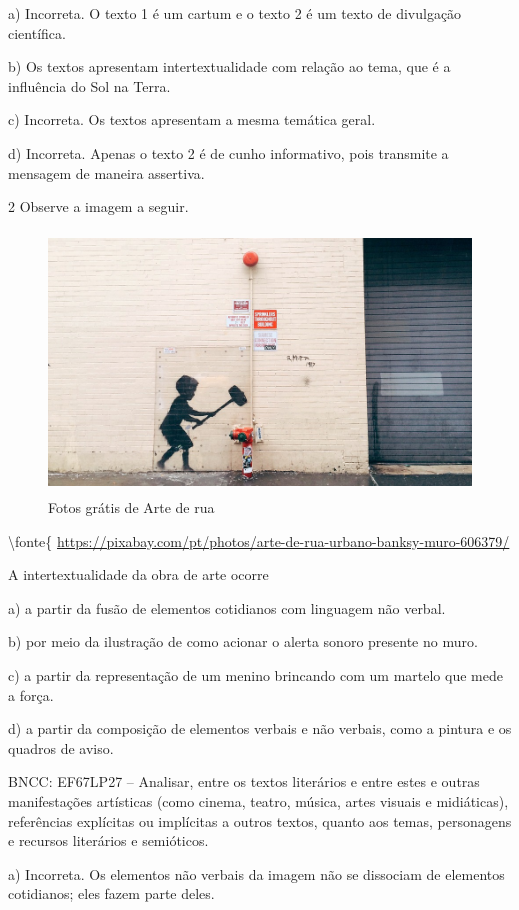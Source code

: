 a) Incorreta. O texto 1 é um cartum e o texto 2 é um texto de divulgação
científica.

b) Os textos apresentam intertextualidade com relação ao tema, que é a
influência do Sol na Terra.

c) Incorreta. Os textos apresentam a mesma temática geral.

d) Incorreta. Apenas o texto 2 é de cunho informativo, pois transmite a
mensagem de maneira assertiva.

\num{2} Observe a imagem a seguir.

\begin{figure}
\centering
\includegraphics[width=4.69016in,height=2.73611in]{./imgSAEB_6_POR/media/image13.jpeg}
\caption{Fotos grátis de Arte de rua}
\end{figure}

\textbackslash fonte\{
\url{https://pixabay.com/pt/photos/arte-de-rua-urbano-banksy-muro-606379/}

A intertextualidade da obra de arte ocorre

a) a partir da fusão de elementos cotidianos com linguagem não verbal.

b) por meio da ilustração de como acionar o alerta sonoro presente no
muro.

c) a partir da representação de um menino brincando com um martelo que
mede a força.

d) a partir da composição de elementos verbais e não verbais, como a
pintura e os quadros de aviso.

BNCC: EF67LP27 -- Analisar, entre os textos literários e entre estes e
outras manifestações artísticas (como cinema, teatro, música, artes
visuais e midiáticas), referências explícitas ou implícitas a outros
textos, quanto aos temas, personagens e recursos literários e
semióticos.

a) Incorreta. Os elementos não verbais da imagem não se dissociam de
elementos cotidianos; eles fazem parte deles.

